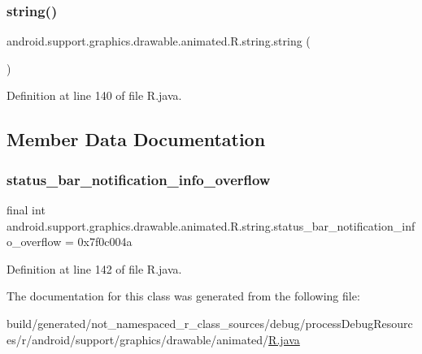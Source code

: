 \subsubsection{\texorpdfstring{string()}{string()}}
{\footnotesize\ttfamily android.\+support.\+graphics.\+drawable.\+animated.\+R.\+string.\+string (\begin{DoxyParamCaption}{ }\end{DoxyParamCaption})\hspace{0.3cm}{\ttfamily [private]}}



Definition at line 140 of file R.\+java.


\begin{DoxyCode}{0}

\end{DoxyCode}


\subsection{Member Data Documentation}
\mbox{\label{classandroid_1_1support_1_1graphics_1_1drawable_1_1animated_1_1_r_1_1string_adb1e336cab06d5a619196b54c531a8fe}} 
\subsubsection{\texorpdfstring{status\_bar\_notification\_info\_overflow}{status\_bar\_notification\_info\_overflow}}
{\footnotesize\ttfamily final int android.\+support.\+graphics.\+drawable.\+animated.\+R.\+string.\+status\+\_\+bar\+\_\+notification\+\_\+info\+\_\+overflow = 0x7f0c004a\hspace{0.3cm}{\ttfamily [static]}}



Definition at line 142 of file R.\+java.



The documentation for this class was generated from the following file\+:\begin{DoxyCompactItemize}
\item 
build/generated/not\+\_\+namespaced\+\_\+r\+\_\+class\+\_\+sources/debug/process\+Debug\+Resources/r/android/support/graphics/drawable/animated/\mbox{\hyperlink{android_2support_2graphics_2drawable_2animated_2_r_8java}{R.\+java}}\end{DoxyCompactItemize}
